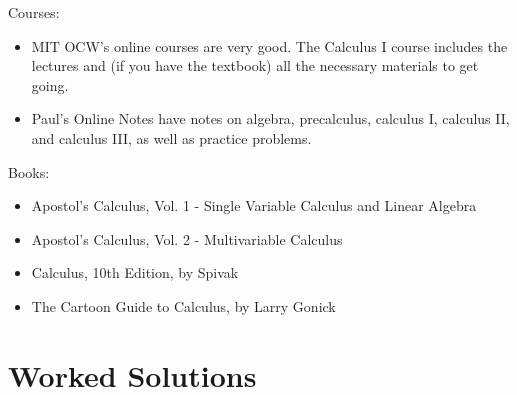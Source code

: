 \documentclass[12pt]{article}
\begin{document}
Courses:
\begin{itemize}
\item MIT OCW's online courses are very good. The Calculus I course includes the lectures and (if you have the textbook) all the necessary materials to get going.
\item Paul's Online Notes have notes on algebra, precalculus, calculus I, calculus II, and calculus III, as well as practice problems.
\end{itemize}

Books:
\begin{itemize}
\item Apostol's Calculus, Vol. 1 - Single Variable Calculus and Linear Algebra
\item Apostol's Calculus, Vol. 2 - Multivariable Calculus
\item Calculus, 10th Edition, by Spivak
\item The Cartoon Guide to Calculus, by Larry Gonick
\end{itemize}

\section{Worked Solutions}


\end{document}
